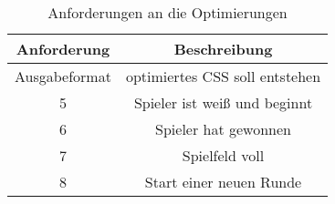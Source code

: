 \begin{table}[ht!]
	\centering
	\begin{tabular}{c | c}
		Anforderung & Beschreibung \\
		\hline
		Ausgabeformat & optimiertes CSS soll entstehen \\
		5 & Spieler ist weiß und beginnt \\
		6 & Spieler hat gewonnen \\
		7 & Spielfeld voll \\
		8 & Start einer neuen Runde \\
	\end{tabular}
	\caption{Anforderungen an die Optimierungen}
	\label{server-proto-bit-usage}
\end{table}